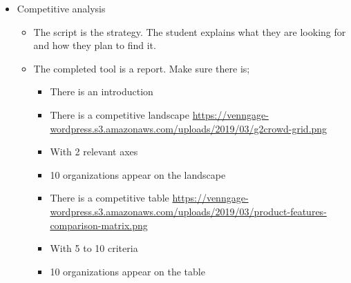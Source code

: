 \begin{itemize}
\item Competitive analysis
\begin{itemize}
\item The script is the strategy. The student explains what they are looking for and how they plan to find it.
\item The completed tool is a report. Make sure there is;
\begin{itemize}
\item There is an introduction
\item There is a competitive landscape \url{https://venngage-wordpress.s3.amazonaws.com/uploads/2019/03/g2crowd-grid.png}
\item With 2 relevant axes
\item 10 organizations appear on the landscape
\item There is a competitive table \url{https://venngage-wordpress.s3.amazonaws.com/uploads/2019/03/product-features-comparison-matrix.png}
\item With 5 to 10 criteria
\item 10 organizations appear on the table
\end{itemize}
\end{itemize}
\end{itemize}

